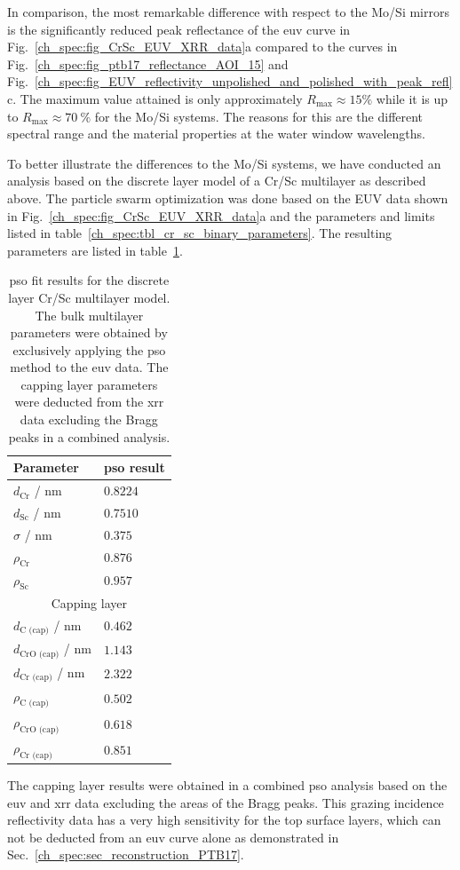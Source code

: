 In comparison, the most remarkable difference with respect to the Mo/Si mirrors is the significantly reduced peak reflectance of the \gls{euv} curve in Fig.~\ref{ch_spec:fig_CrSc_EUV_XRR_data}a compared to the curves in Fig.~\ref{ch_spec:fig_ptb17_reflectance_AOI_15} and Fig.~\ref{ch_spec:fig_EUV_reflectivity_unpolished_and_polished_with_peak_refl}c. The maximum value attained is only approximately $R_\text{max} \approx 15\%$ while it is up to $R_\text{max} \approx \SI{70}{\percent}$ for the Mo/Si systems. The reasons for this are the different spectral range and the material properties at the water window wavelengths.

To better illustrate the differences to the Mo/Si systems, we have conducted an 
analysis based on the discrete layer model of a Cr/Sc multilayer as described above. The particle swarm optimization was done based on the EUV data shown in Fig.~\ref{ch_spec:fig_CrSc_EUV_XRR_data}a and the parameters and limits listed in table~\ref{ch_spec:tbl_cr_sc_binary_parameters}. The resulting parameters are listed in table~\ref{ch_spec:tbl_cr_sc_binary_pso_results}.
\begin{table}[htbp]
\centering
\caption{\gls{pso} fit results for the discrete layer Cr/Sc multilayer model. The bulk multilayer parameters were obtained by exclusively applying the \gls{pso} method to the \gls{euv} data. The capping layer parameters were deducted from the \gls{xrr} data excluding the Bragg peaks in a combined analysis.}
\label{ch_spec:tbl_cr_sc_binary_pso_results}
\begin{tabular}{@{}ll@{}}
\toprule
Parameter &  \gls{pso} result\\ \midrule
$d_\text{Cr}$ / nm &  $0.8224$\\ 
$d_\text{Sc}$ / nm &  $0.7510$\\ 
$\sigma$ / nm &  $0.375$\\ 
$\rho_\text{Cr}$  & $0.876$\\ 
$\rho_\text{Sc}$ & $0.957$\\ 
\midrule
\multicolumn{2}{c}{Capping layer}\\
\midrule
$d_\text{C (cap)}$ / nm  & $0.462$ \\ 
$d_\text{CrO (cap)}$ / nm  & $1.143$ \\ 
$d_\text{Cr (cap)}$ / nm  & $2.322$ \\ 
$\rho_\text{C (cap)}$ & $0.502$\\ 
$\rho_\text{CrO (cap)}$& $0.618$\\
$\rho_\text{Cr (cap)}$ & $0.851$\\
 \bottomrule
\end{tabular}
\end{table}
The capping layer results were obtained in a combined \gls{pso} analysis based on the \gls{euv} and \gls{xrr} data excluding the areas of the Bragg peaks. This grazing incidence reflectivity data has a very high sensitivity for the top surface layers, which can not be deducted from an \gls{euv} curve alone as demonstrated in Sec.~\ref{ch_spec:sec_reconstruction_PTB17}.

